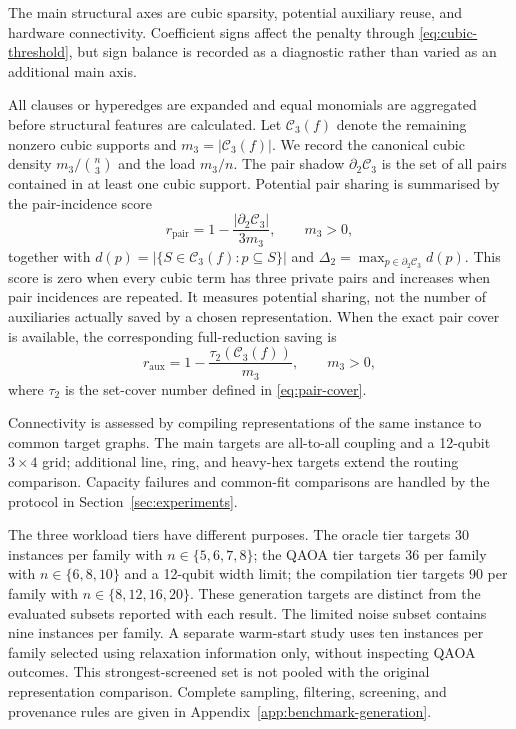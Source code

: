 \documentclass[a4paper,onecolumn,11pt,unpublished]{quantumarticle}
\theoremstyle{remark}
\begin{document}
\label{sec:benchmark-generation}

The main structural axes are cubic sparsity, potential auxiliary reuse, and
hardware connectivity. Coefficient signs affect the penalty through
\cref{eq:cubic-threshold}, but sign balance is recorded as a diagnostic rather
than varied as an additional main axis.

All clauses or hyperedges are expanded and equal monomials are aggregated
before structural features are calculated.  Let $\mathcal C_3(f)$ denote the
remaining nonzero cubic supports and $m_3=|\mathcal C_3(f)|$.  We record the
canonical cubic density $m_3/\binom{n}{3}$ and the load $m_3/n$.  The pair shadow
$\partial_2\mathcal C_3$ is the set of all pairs contained in at least one
cubic support.  Potential pair sharing is summarised by the pair-incidence
score
\begin{equation}
  r_{\mathrm{pair}}
  =1-\frac{|\partial_2\mathcal C_3|}{3m_3},
  \qquad m_3>0,
  \label{eq:pair-reuse-score}
\end{equation}
together with $d(p)=|\{S\in\mathcal C_3(f):p\subseteq S\}|$ and
$\Delta_2=\max_{p\in\partial_2\mathcal C_3}d(p)$.  This score
is zero when every cubic term has three private pairs and increases when pair
incidences are repeated.  It measures potential sharing, not the number of
auxiliaries actually saved by a chosen representation.  When the exact pair
cover is available, the corresponding full-reduction saving is
\begin{equation}
  r_{\mathrm{aux}}
  =1-\frac{\tau_2(\mathcal C_3(f))}{m_3},
  \qquad m_3>0,
  \label{eq:auxiliary-saving-score}
\end{equation}
where $\tau_2$ is the set-cover number defined in \cref{eq:pair-cover}.

Connectivity is assessed by compiling representations of the same instance to
common target graphs. The main targets are all-to-all coupling and a 12-qubit
$3\times4$ grid; additional line, ring, and heavy-hex targets extend the
routing comparison. Capacity failures and common-fit comparisons are handled
by the protocol in Section~\ref{sec:experiments}.

The three workload tiers have different purposes. The oracle tier targets
30 instances per family with $n\in\{5,6,7,8\}$; the QAOA tier targets 36 per
family with $n\in\{6,8,10\}$ and a 12-qubit width limit; the compilation tier
targets 90 per family with $n\in\{8,12,16,20\}$. These generation targets are
distinct from the evaluated subsets reported with each result. The limited
noise subset contains nine instances per family. A separate warm-start study
uses ten instances per family selected using relaxation information only,
without inspecting QAOA outcomes. This strongest-screened set is not pooled
with the original representation comparison. Complete sampling, filtering,
screening, and provenance rules are given in
Appendix~\ref{app:benchmark-generation}.
\end{document}

